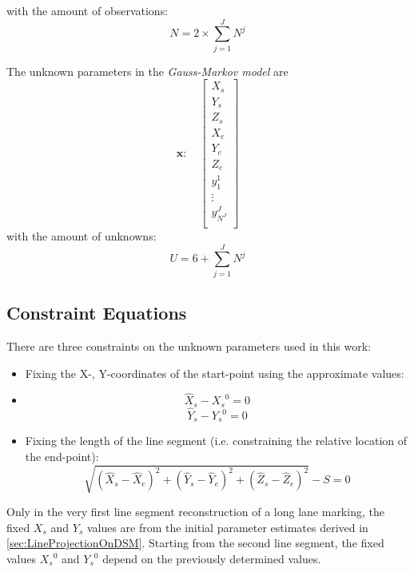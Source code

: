 with the amount of observations:
\begin{equation}
	N=2\times\displaystyle\sum_{j=1}^{J}N^j
\end{equation}

The unknown parameters in the \textit{Gauss-Markov model} are
\begin{equation}
	\boldsymbol x:\quad
	\begin{bmatrix}
		X_s\\
		Y_s\\
		Z_s\\
		X_e\\
		Y_e\\
		Z_e\\
		y^1_1\\[0.3em]
		\vdots\\
		y^J_{N^J}\\[0.3em]
	\end{bmatrix}
\end{equation}
with the amount of unknowns:
\begin{equation}
	U=6+\displaystyle\sum_{j=1}^{J}N^j
\end{equation}

\clearpage

\subsection{Constraint Equations}
\label{subsec:ConEqua}

There are three constraints on the unknown parameters used in this work:
\begin{itemize}
\item Fixing the X-, Y-coordinates of the start-point using the approximate values:
\item [] \begin{equation} \label{eq:constraint1}
\hat{X}_s-{X_s}^0=0
\end{equation}
\begin{equation} \label{eq:constraint2}
\hat{Y}_s-{Y_s}^0=0
\end{equation}
\item Fixing the length of the line segment (i.e. constraining the relative location of the end-point):
\begin{equation} \label{eq:constraint3}
\sqrt{(\hat{X}_s-\hat{X}_e)^2+(\hat{Y}_s-\hat{Y}_e)^2+(\hat{Z}_s-\hat{Z}_e)^2}-S=0
\end{equation}
\end{itemize}

Only in the very first line segment reconstruction of a long lane marking, the fixed $X_s$ and $Y_s$ values are from the initial parameter estimates derived in \cref{sec:LineProjectionOnDSM}. Starting from the second line segment, the fixed values ${X_s}^0$ and ${Y_s}^0$ depend on the previously determined values.

